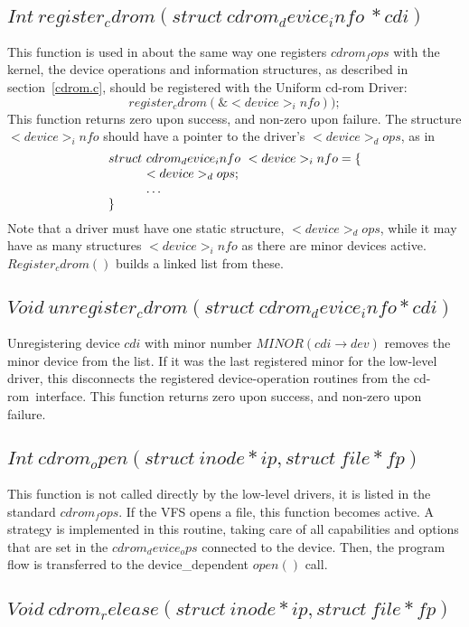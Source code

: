 \documentclass{article}
\def\cdrom{{\sc cd-rom}}
\def\UCD{{\sc Uniform cd-rom Driver}}
\begin{document}
\subsection{$Int\ register_cdrom( struct\ cdrom_device_info\ * cdi)$}

This function is used in about the same way one registers $cdrom_fops$
with the kernel, the device operations and information structures,
as described in section~\ref{cdrom.c}, should be registered with the
\UCD:
$$
register_cdrom(\&<device>_info));
$$
This function returns zero upon success, and non-zero upon
failure. The structure $<device>_info$ should have a pointer to the
driver's $<device>_dops$, as in 
$$
\vbox{\halign{&$#$\hfil\cr
struct\ &cdrom_device_info\ <device>_info = \{\cr
& <device>_dops;\cr
&\ldots\cr
\}\cr
}}$$
Note that a driver must have one static structure, $<device>_dops$, while
it may have as many structures $<device>_info$ as there are minor devices
active. $Register_cdrom()$ builds a linked list from these. 

\subsection{$Void\ unregister_cdrom(struct\ cdrom_device_info * cdi)$}

Unregistering device $cdi$ with minor number $MINOR(cdi\to dev)$ removes
the minor device from the list. If it was the last registered minor for
the low-level driver, this disconnects the registered device-operation
routines from the \cdrom\ interface. This function returns zero upon
success, and non-zero upon failure.

\subsection{$Int\ cdrom_open(struct\ inode * ip, struct\ file * fp)$}

This function is not called directly by the low-level drivers, it is
listed in the standard $cdrom_fops$. If the VFS opens a file, this
function becomes active. A strategy is implemented in this routine,
taking care of all capabilities and options that are set in the
$cdrom_device_ops$ connected to the device. Then, the program flow is
transferred to the device_dependent $open()$ call.

\subsection{$Void\ cdrom_release(struct\ inode *ip, struct\ file
*fp)$}
\end{document}
